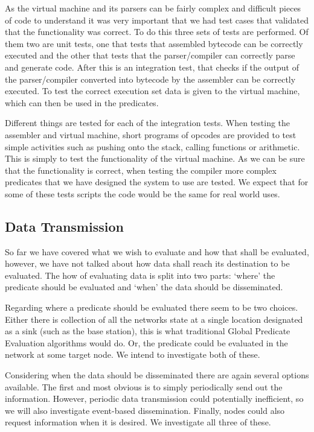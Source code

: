 As the virtual machine and its parsers can be fairly complex and difficult pieces of code to understand it was very important that we had test cases that validated that the functionality was correct. To do this three sets of tests are performed. Of them two are unit tests, one that tests that assembled bytecode can be correctly executed and the other that tests that the parser/compiler can correctly parse and generate code. After this is an integration test, that checks if the output of the parser/compiler converted into bytecode by the assembler can be correctly executed. To test the correct execution set data is given to the virtual machine, which can then be used in the predicates.

Different things are tested for each of the integration tests. When testing the assembler and virtual machine, short programs of opcodes are provided to test simple activities such as pushing onto the stack, calling functions or arithmetic. This is simply to test the functionality of the virtual machine. As we can be sure that the functionality is correct, when testing the compiler more complex predicates that we have designed the system to use are tested. We expect that for some of these tests scripts the code would be the same for real world uses.



\subsection{Data Transmission}

So far we have covered what we wish to evaluate and how that shall be evaluated, however, we have not talked about how data shall reach its destination to be evaluated. The how of evaluating data is split into two parts: `where' the predicate should be evaluated and `when' the data should be disseminated.

Regarding where a predicate should be evaluated there seem to be two choices. Either there is collection of all the networks state at a single location designated as a sink (such as the base station), this is what traditional Global Predicate Evaluation algorithms would do. Or, the predicate could be evaluated in the network at some target node. We intend to investigate both of these.

Considering when the data should be disseminated there are again several options available. The first and most obvious is to simply periodically send out the information. However, periodic data transmission could potentially inefficient, so we will also investigate event-based dissemination. Finally, nodes could also request information when it is desired. We investigate all three of these.

